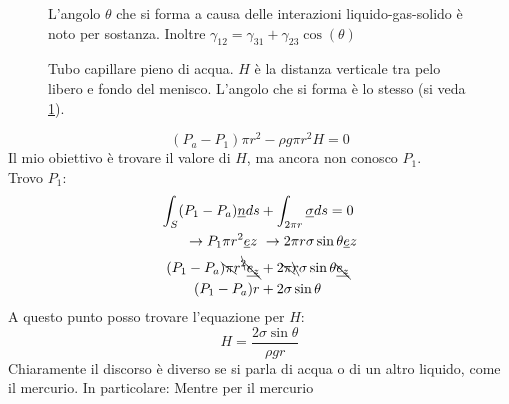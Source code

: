 \begin{figure}[H]
  \centering
  \caption{L'angolo $ \theta  $ che si forma a causa delle interazioni liquido-gas-solido è noto per sostanza. Inoltre $ \gamma_{12}=\gamma_{31}+\gamma_{23}\cos(\theta) $}
  \label{fig:angolo_tensione}
\end{figure}
\begin{figure}[H]
  \centering
  \caption{Tubo capillare pieno di acqua. $ H $ è la distanza verticale tra pelo libero e fondo del menisco. L'angolo che si forma è lo stesso (si veda \cref{fig:angolo_tensione}).}
  \label{fig:TuboCapillare_acqua}
\end{figure}
\begin{equation*}
  (P_a - P_1)\pi r^2-\rho g\pi r^2H=0
\end{equation*}
Il mio obiettivo è trovare il valore di $ H $, ma ancora non conosco $ P_1 $.\\
Trovo $ P_1 $:
\begin{eqnarray*}
  \int_S(P_1-P_a)\underline{n}ds &+ \int_{2\pi r}\underline{\sigma}ds=0\\
  \to P_1\pi r^2 \underline{e}z\,&\,\to 2\pi r\sigma \sin \theta  \underline{e}z\\
  (P_1-P_a)\bcancel{\pi }r^{\bcancel{2}}\bcancel{\underline{e_z}} &+ 2\bcancel{\pi} \bcancel{r} \sigma \sin  \theta \bcancel{\underline{e_z}}\\
  (P_1-P_a)r&+2\sigma \sin \theta 
\end{eqnarray*}
A questo punto posso trovare l'equazione per $ H $:
\begin{equation}
  H = \frac{2\sigma \sin \theta }{\rho gr}
\end{equation}
Chiaramente il discorso è diverso se si parla di acqua o di un altro liquido, come il mercurio. In particolare:
Mentre per il mercurio

